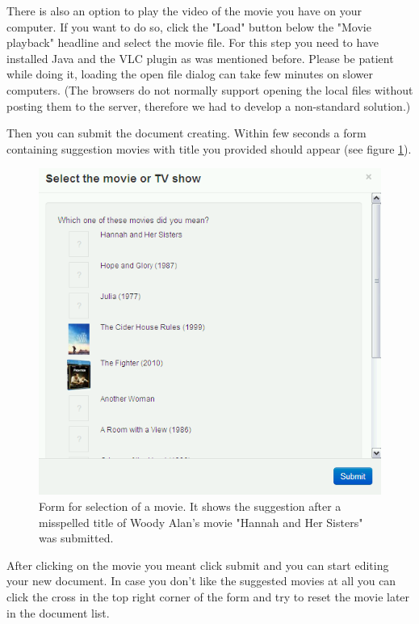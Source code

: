 There is also an option to play the video of the movie you have on your computer. If you want to do so, click the "Load" button below the "Movie playback" headline and select the movie file. For this step you need to have installed Java and the VLC plugin as was mentioned before. Please be patient while doing it, loading the open file dialog can take few minutes  on slower computers. (The browsers do not normally support opening the local files without posting them to the server, therefore we had to develop a non-standard solution.) 

Then you can submit the document creating. Within few seconds a form containing suggestion movies with title you provided should appear (see figure \ref{fig:media_sources}).

\begin{figure}[h]
\begin{center}
\includegraphics[scale=0.4]{figures/user_manual/media_sources.png}
\end{center}
\caption{Form for selection of a movie. It shows the suggestion after a misspelled title of Woody Alan's movie "Hannah and Her Sisters" was submitted.}
\label{fig:media_sources}
\end{figure}

After clicking on the movie you meant click submit and you can start editing your new document. In case you don't like the suggested movies at all you can click the cross in the top right corner of the form and try to reset the movie later in the document list.

